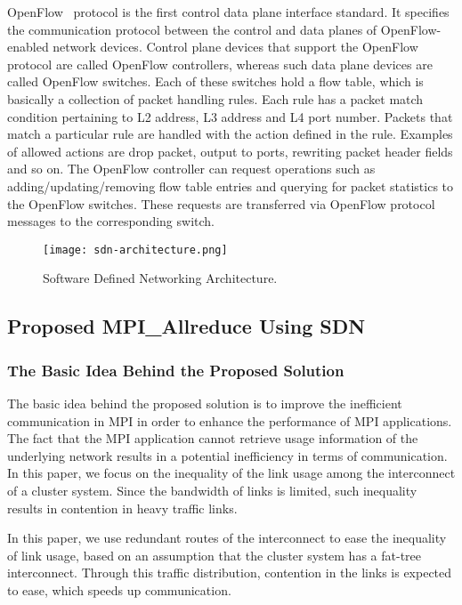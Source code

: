 OpenFlow~\autocite{sdn} protocol is the first control data plane interface
standard. It specifies the communication protocol between the control
and data planes of OpenFlow-enabled network devices. Control plane
devices that support the OpenFlow protocol are called OpenFlow
controllers, whereas such data plane devices are called OpenFlow
switches. Each of these switches hold a flow table, which is basically a
collection of packet handling rules. Each rule has a packet match
condition pertaining to L2 address, L3 address and L4 port number.
Packets that match a particular rule are handled with the action defined
in the rule. Examples of allowed actions are drop packet, output to
ports, rewriting packet header fields and so on. The OpenFlow controller
can request operations such as adding/updating/removing flow table
entries and querying for packet statistics to the OpenFlow switches.
These requests are transferred via OpenFlow protocol messages to the
corresponding switch.

\begin{figure}[htbp]
    \centering
    \texttt{[image: sdn-architecture.png]}
    \caption{Software Defined Networking Architecture.}%
    \label{fig-sdn-architecture}
\end{figure}

\subsection{Proposed MPI\_Allreduce Using SDN}

\subsubsection{The Basic Idea Behind the Proposed Solution}

The basic idea behind the proposed solution is to improve the
inefficient communication in MPI in order to enhance the performance of
MPI applications. The fact that the MPI application cannot retrieve
usage information of the underlying network results in a potential
inefficiency in terms of communication. In this paper, we focus on the
inequality of the link usage among the interconnect of a cluster system. Since
the bandwidth of links is limited, such inequality results in contention in
heavy traffic links.

In this paper, we use redundant routes of the interconnect to ease the
inequality of link usage, based on an assumption that the cluster system has a
fat-tree interconnect. Through this traffic distribution, contention in the
links is expected to ease, which speeds up communication.

